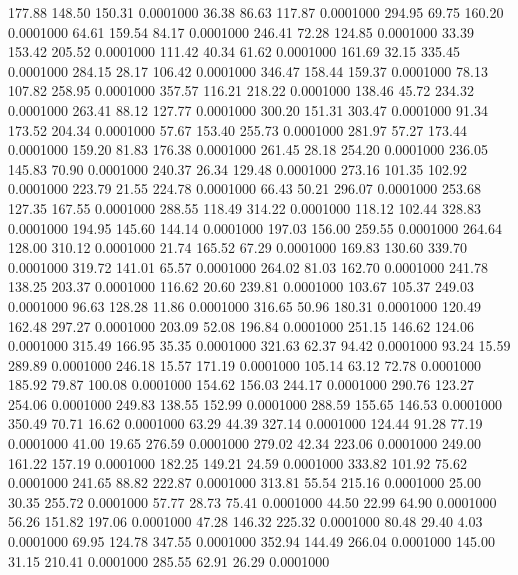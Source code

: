  177.88  148.50  150.31   0.0001000
  36.38   86.63  117.87   0.0001000
 294.95   69.75  160.20   0.0001000
  64.61  159.54   84.17   0.0001000
 246.41   72.28  124.85   0.0001000
  33.39  153.42  205.52   0.0001000
 111.42   40.34   61.62   0.0001000
 161.69   32.15  335.45   0.0001000
 284.15   28.17  106.42   0.0001000
 346.47  158.44  159.37   0.0001000
  78.13  107.82  258.95   0.0001000
 357.57  116.21  218.22   0.0001000
 138.46   45.72  234.32   0.0001000
 263.41   88.12  127.77   0.0001000
 300.20  151.31  303.47   0.0001000
  91.34  173.52  204.34   0.0001000
  57.67  153.40  255.73   0.0001000
 281.97   57.27  173.44   0.0001000
 159.20   81.83  176.38   0.0001000
 261.45   28.18  254.20   0.0001000
 236.05  145.83   70.90   0.0001000
 240.37   26.34  129.48   0.0001000
 273.16  101.35  102.92   0.0001000
 223.79   21.55  224.78   0.0001000
  66.43   50.21  296.07   0.0001000
 253.68  127.35  167.55   0.0001000
 288.55  118.49  314.22   0.0001000
 118.12  102.44  328.83   0.0001000
 194.95  145.60  144.14   0.0001000
 197.03  156.00  259.55   0.0001000
 264.64  128.00  310.12   0.0001000
  21.74  165.52   67.29   0.0001000
 169.83  130.60  339.70   0.0001000
 319.72  141.01   65.57   0.0001000
 264.02   81.03  162.70   0.0001000
 241.78  138.25  203.37   0.0001000
 116.62   20.60  239.81   0.0001000
 103.67  105.37  249.03   0.0001000
  96.63  128.28   11.86   0.0001000
 316.65   50.96  180.31   0.0001000
 120.49  162.48  297.27   0.0001000
 203.09   52.08  196.84   0.0001000
 251.15  146.62  124.06   0.0001000
 315.49  166.95   35.35   0.0001000
 321.63   62.37   94.42   0.0001000
  93.24   15.59  289.89   0.0001000
 246.18   15.57  171.19   0.0001000
 105.14   63.12   72.78   0.0001000
 185.92   79.87  100.08   0.0001000
 154.62  156.03  244.17   0.0001000
 290.76  123.27  254.06   0.0001000
 249.83  138.55  152.99   0.0001000
 288.59  155.65  146.53   0.0001000
 350.49   70.71   16.62   0.0001000
  63.29   44.39  327.14   0.0001000
 124.44   91.28   77.19   0.0001000
  41.00   19.65  276.59   0.0001000
 279.02   42.34  223.06   0.0001000
 249.00  161.22  157.19   0.0001000
 182.25  149.21   24.59   0.0001000
 333.82  101.92   75.62   0.0001000
 241.65   88.82  222.87   0.0001000
 313.81   55.54  215.16   0.0001000
  25.00   30.35  255.72   0.0001000
  57.77   28.73   75.41   0.0001000
  44.50   22.99   64.90   0.0001000
  56.26  151.82  197.06   0.0001000
  47.28  146.32  225.32   0.0001000
  80.48   29.40    4.03   0.0001000
  69.95  124.78  347.55   0.0001000
 352.94  144.49  266.04   0.0001000
 145.00   31.15  210.41   0.0001000
 285.55   62.91   26.29   0.0001000
